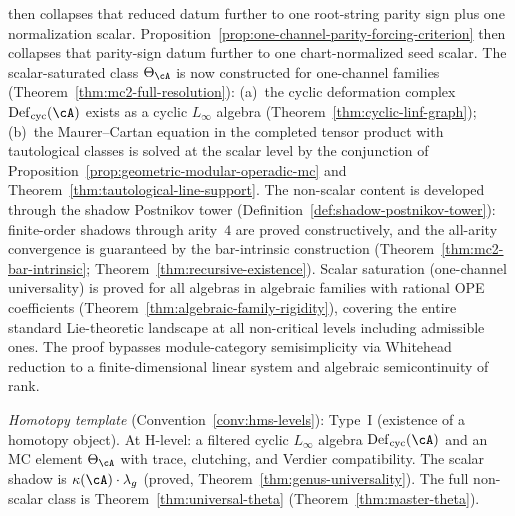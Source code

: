 \begin{remark}[Scope]
then collapses that reduced datum further to one root-string parity
sign plus one normalization scalar.
Proposition~\ref{prop:one-channel-parity-forcing-criterion}
then collapses that parity-sign datum further to one chart-normalized
seed scalar.
The scalar-saturated class $\Theta_{\cA}$ is now constructed
for one-channel families
(Theorem~\ref{thm:mc2-full-resolution}): (a)~the cyclic
deformation complex $\operatorname{Def}_{\mathrm{cyc}}(\cA)$
exists as a cyclic $L_\infty$ algebra
(Theorem~\ref{thm:cyclic-linf-graph}); (b)~the Maurer--Cartan
equation in the completed tensor product with tautological classes
is solved at the scalar level by the conjunction of
Proposition~\ref{prop:geometric-modular-operadic-mc} and
Theorem~\ref{thm:tautological-line-support}.
The non-scalar content is developed through the shadow
Postnikov tower
(Definition~\ref{def:shadow-postnikov-tower}): finite-order
shadows through arity~$4$ are proved constructively, and the
all-arity convergence is guaranteed by the bar-intrinsic
construction (Theorem~\ref{thm:mc2-bar-intrinsic};
Theorem~\ref{thm:recursive-existence}).
Scalar saturation (one-channel universality) is proved
for all algebras in algebraic families with rational OPE
coefficients (Theorem~\ref{thm:algebraic-family-rigidity}),
covering the entire standard Lie-theoretic landscape at
all non-critical levels including admissible ones.
The proof bypasses module-category semisimplicity via
Whitehead reduction to a finite-dimensional linear system
and algebraic semicontinuity of rank.

\emph{Homotopy template} (Convention~\ref{conv:hms-levels}): Type~I
(existence of a homotopy object).  At H-level: a filtered cyclic $L_\infty$
algebra $\operatorname{Def}_{\mathrm{cyc}}(\cA)$ and an MC element $\Theta_\cA$
with trace, clutching, and Verdier compatibility.  The scalar shadow is
$\kappa(\cA) \cdot \lambda_g$ (proved, Theorem~\ref{thm:genus-universality}).
The full non-scalar class is Theorem~\ref{thm:universal-theta}
(Theorem~\ref{thm:master-theta}).
\end{remark}

